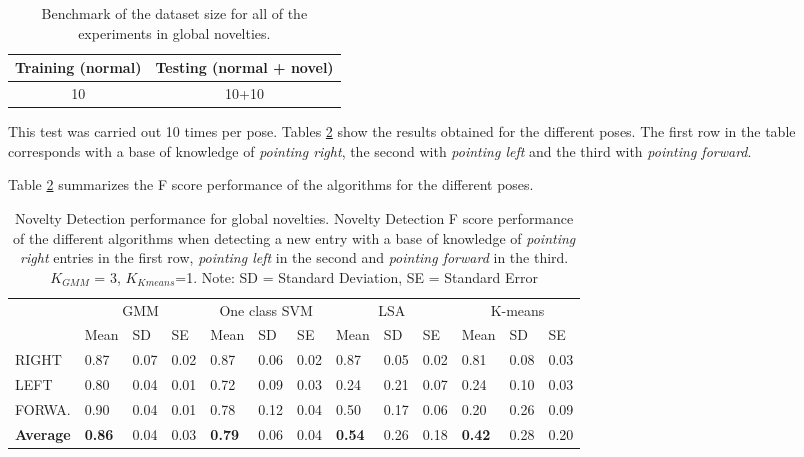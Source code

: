 \begin{table}[h]
    \begin{tabular}{cc}
    \hline
    Training (normal) & Testing (normal + novel) \\ 
    \hline
    10 & 10+10 \\
    \hline 
    \end{tabular}
    \centering
    \caption{Benchmark of the dataset size for all of the experiments in global novelties. \label{Tglo}}
\end{table}

This test was carried out 10 times per pose. Tables \ref{global} show the results obtained for the different poses. The first row in the table corresponds with a base of knowledge of \emph{pointing right}, the second with \emph{pointing left} and the third with \emph{pointing forward}.

Table \ref{global} summarizes the F score performance of the algorithms for the different poses.

\begin{table}[!ht]
	\footnotesize
	\renewcommand{\arraystretch}{2}
	\begin{tabular}{p{1.2cm}p{0.7cm}p{0.6cm}p{0.7cm}p{0.7cm}p{0.6cm}p{0.7cm}p{0.7cm}p{0.6cm}p{0.7cm}p{0.7cm}p{0.6cm}p{0.7cm}}
	\hline 
	 & \multicolumn{3}{c}{GMM}& \multicolumn{3}{c}{One class SVM}& \multicolumn{3}{c}{LSA}& \multicolumn{3}{c}{K-means} \\
	 & Mean    & SD & SE& Mean    & SD & SE& Mean    & SD & SE& Mean    & SD & SE \\
	\hline
	RIGHT   & 0.87 & 0.07 & 0.02 & 0.87 & 0.06 & 0.02 & 0.87 & 0.05 & 0.02 & 0.81 & 0.08 & 0.03    \\ 
	LEFT  & 0.80 & 0.04 & 0.01 & 0.72 & 0.09 & 0.03 & 0.24 & 0.21 & 0.07 & 0.24 & 0.10 & 0.03  \\
	FORWA.  & 0.90 & 0.04 & 0.01 & 0.78 & 0.12 & 0.04 & 0.50 & 0.17 & 0.06 & 0.20 & 0.26 & 0.09 \\
	\textbf{Average} & \textbf{0.86} & 0.04 & 0.03 & \textbf{0.79} & 0.06 & 0.04 & \textbf{0.54} & 0.26 & 0.18 & \textbf{0.42} & 0.28 & 0.20 \\
	\hline
	\end{tabular}
	\centering
	\caption[Novelty Detection F score performance for global novelties]{Novelty Detection performance for global novelties. Novelty Detection F score performance of the different algorithms when detecting a new entry with a base of knowledge of \emph{pointing right} entries in the first row, \emph{pointing left} in the second and \emph{pointing forward} in the third. $ K_{GMM} $ = 3, $ K_{Kmeans} $=1. Note: SD = Standard Deviation, SE = Standard Error \label{global}}
\end{table}

